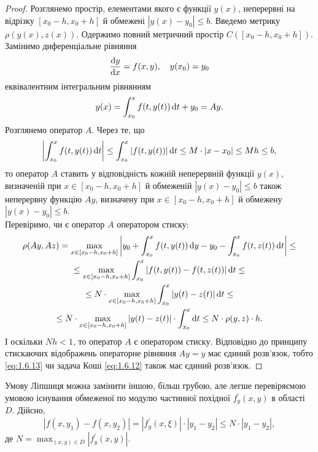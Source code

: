 \begin{proof}
	Розглянемо простір, елементами якого є функції $y(x)$, неперервні на відрізку $[x_0 - h, x_0 + h]$ й обмежені $|y(x) - y_0| \le b$. Введемо метрику $\rho(y(x), z(x))$. Одержимо повний метричний простір $C([x_0 - h, x_0 + h])$. Замінимо диференціальне рівняння
	\begin{equation}
		\label{eq:1.6.12}
		\frac{\mathop{}\!\mathrm{d} y}{\mathop{}\!\mathrm{d} x} = f(x, y), \quad y(x_0) = y_0
	\end{equation}
	еквівалентним інтегральним рівнянням
	\begin{equation}
		\label{eq:1.6.13}
		y(x) = \int_{x_0}^x f(t, y(t)) \mathop{}\!\mathrm{d} t + y_0 = A y.
	\end{equation}
	Розглянемо оператор $A$. Через те, що  
	\begin{equation}
		\label{eq:1.6.14}
		\left|\int_{x_0}^x f(t, y(t)) \mathop{}\!\mathrm{d} t \right| \le \int_{x_0}^x |f(t, y(t))| \mathop{}\!\mathrm{d} t \le M \cdot |x-x_0| \le Mh \le b,
	\end{equation}
	то оператор $A$ ставить у відповідність кожній неперервній функції $y(x)$, визначеній при $x\in[x_0 - h, x_0 + h]$ й обмеженій $|y(x)-y_0|\le b$ також неперервну функцію $Ay$,  визначену при $x\in[x_0 - h, x_0 + h]$ й обмежену $|y(x)-y_0|\le b$. \\

	Перевіримо, чи є оператор $A$ оператором стиску:
	\begin{multline}
		\label{eq:1.6.15}
		\rho(Ay, Az) = \max_{x \in[x_0-h,x_0+h]} \left|y_0 + \int_{x_0}^x f(t, y(t)) \mathop{}\!\mathrm{d} y - y_0 - \int_{x_0}^x f(t, z(t)) \mathop{}\!\mathrm{d} t\right| \le \\
		\le \max_{x \in[x_0-h,x_0+h]} \int_{x_0}^x |f(t, y(t)) - f(t, z(t))| \mathop{}\!\mathrm{d} t \le \\
		\le N \cdot \max_{x \in[x_0-h,x_0+h]} \int_{x_0}^x |y(t) - z(t)| \mathop{}\!\mathrm{d} t \le \\
		\le N \cdot \max_{x \in[x_0-h,x_0+h]} |y(t) - z(t)| \cdot \int_{x_0}^x \mathop{}\!\mathrm{d} t \le N \cdot \rho(y, z) \cdot h.
	\end{multline}
	І оскільки $Nh < 1$, то оператор $A$ є оператором стиску. Відповідно до принципу стискаючих відображень операторне рівняння $Ay=y$ має єдиний розв’язок, тобто \eqref{eq:1.6.13} чи задача Коші \eqref{eq:1.6.12} також має єдиний розв’язок.
\end{proof}

\begin{remark}
	Умову Ліпшиця можна замінити іншою, більш грубою, але легше перевіряємою умовою існування обмеженої по модулю частинної похідної $f_y^\prime (x,y)$ в області $D$. Дійсно,
	\begin{equation}
		\label{eq:1.6.16}
		|f(x,y_1)-f(x,y_2)|=|f_y^\prime(x,\xi)|\cdot|y_1-y_2|\le N\cdot|y_1-y_2|,
	\end{equation}
	де $N = \max_{(x,y)\in D} |f_y^\prime(x,y)|$.
\end{remark}


